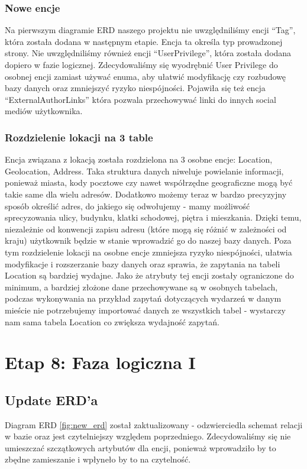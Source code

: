 \documentclass{article}
\begin{document}
\subsubsection{Nowe encje}
Na pierwszym diagramie ERD naszego projektu nie uwzględniliśmy encji “Tag”, która została dodana w następnym etapie. Encja ta określa typ prowadzonej strony. Nie uwzględniliśmy również encji “UserPrivilege”, która została dodana dopiero w fazie logicznej. Zdecydowaliśmy się wyodrębnić User Privilege do osobnej encji zamiast używać enuma, aby ułatwić modyfikację czy rozbudowę bazy danych oraz zmniejszyć ryzyko niespójności.
Pojawiła się też encja “ExternalAuthorLinks” która pozwala przechowywać linki do innych social mediów użytkownika.


\subsubsection{Rozdzielenie lokacji na 3 table}
Encja związana z lokacją została rozdzielona na 3 osobne encje: Location, Geolocation, Address. Taka struktura danych niweluje powielanie informacji, ponieważ miasta, kody pocztowe czy nawet współrzędne geograficzne mogą być takie same dla wielu adresów. Dodatkowo możemy teraz w bardzo precyzyjny sposób określić adres, do jakiego się odwołujemy -  mamy możliwość sprecyzowania ulicy, budynku, klatki schodowej, piętra i mieszkania. Dzięki temu, niezależnie od konwencji zapisu adresu (które mogą się różnić w zależności od kraju) użytkownik będzie w stanie wprowadzić go do naszej bazy danych.
Poza tym rozdzielenie lokacji na osobne encje zmniejsza ryzyko niespójności, ułatwia modyfikacje i rozszerzanie bazy danych oraz sprawia, że zapytania na tabeli Location są bardziej wydajne. Jako że atrybuty tej encji zostały ograniczone do minimum, a bardziej złożone dane przechowywane są w osobnych tabelach, podczas wykonywania na przykład zapytań dotyczących wydarzeń w danym mieście nie potrzebujemy importować danych ze wszystkich tabel - wystarczy nam sama tabela Location co zwiększa wydajność zapytań.


\section{Etap 8: Faza logiczna I}

\subsection{Update ERD'a}

Diagram ERD \ref{fig:new_erd} został zaktualizowany - odzwierciedla schemat relacji w bazie oraz jest czytelniejszy względem poprzedniego. Zdecydowaliśmy się nie umieszczać szczątkowych artybutów dla encji, ponieważ wprowadziło by to zbędne zamieszanie i wpłyneło by to na czytelność.
\end{document}
